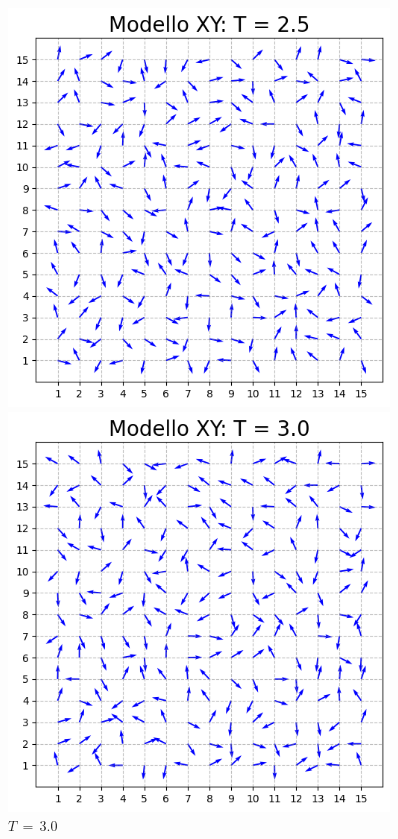 \begin{figure}[H]
    \begin{minipage}{0.45\textwidth}  
      \centering
      \includegraphics[page=1, width=0.9\textwidth]{Immagini/simModelloXY/conf_t2.5.png}
      \caption{$T\,=\,2.5$}
    \end{minipage}\hfill
    \begin{minipage}{0.45\textwidth}  
      \centering
      \includegraphics[page=1, width=0.9\textwidth]{Immagini/simModelloXY/conf_t3.0.png}
      \caption{$T\,=\,3.0$}
    \end{minipage}
    
\end{figure}

\vspace*{\fill}